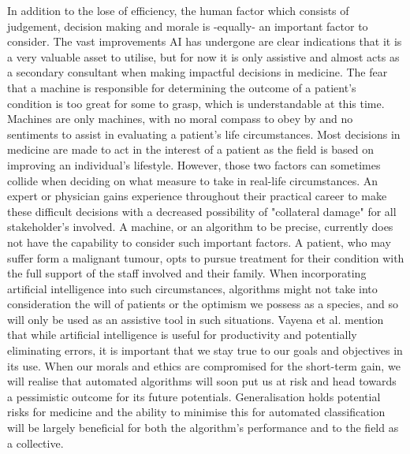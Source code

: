 \documentclass[a4paper]{article}
\begin{document}
        In addition to the lose of efficiency, the human factor which consists of judgement, decision making and morale is -equally- an important factor to consider. The vast improvements AI has undergone are clear indications that it is a very valuable asset to utilise, but for now it is only assistive and almost acts as a secondary consultant when making impactful decisions in medicine. The fear that a machine is responsible for determining the outcome of a patient's condition is too great for some to grasp, which is understandable at this time. Machines are only machines, with no moral compass to obey by and no sentiments to assist in evaluating a patient's life circumstances. Most decisions in medicine are made to act in the interest of a patient as the field is based on improving an individual's lifestyle. However, those two factors can sometimes collide when deciding on what measure to take in real-life circumstances. An expert or physician gains experience throughout their practical career to make these difficult decisions with a decreased possibility of "collateral damage" for all stakeholder's involved. A machine, or an algorithm to be precise, currently does not have the capability to consider such important factors. A patient, who may suffer form a malignant tumour, opts to pursue treatment for their condition with the full support of the staff involved and their family. When incorporating artificial intelligence into such circumstances, algorithms might not take into consideration the will of patients or the optimism we possess as a species, and so will only be used as an assistive tool in such situations. Vayena et al. \cite{RN22} mention that while artificial intelligence is useful for productivity and potentially eliminating errors, it is important that we stay true to our goals and objectives in its use. When our morals and ethics are compromised for the short-term gain, we will realise that automated algorithms will soon put us at risk and head towards a pessimistic outcome for its future potentials. Generalisation holds potential risks for medicine and the ability to minimise this for automated classification will be largely beneficial for both the algorithm's performance and to the field as a collective.
\end{document}
